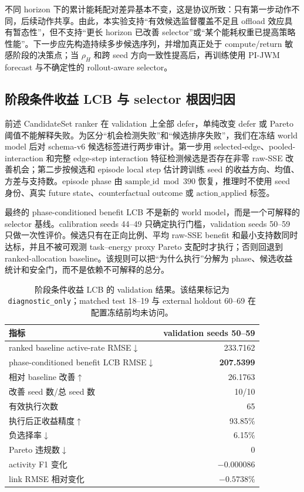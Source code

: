 \documentclass[letterpaper,journal]{IEEEtran}
\newcommand{\tabfontsize}{\footnotesize}
\begin{document}
不同 horizon 下的累计能耗配对差异基本不变，这是协议所致：只有第一步动作不同，后续动作共享。由此，本实验支持“有效候选监督覆盖不足且 offload 效应具有暂态性”，但不支持“更长 horizon 已改善 selector”或“某个能耗权重已提高策略性能”。下一步应先构造持续多步候选序列，并增加真正处于 compute/return 敏感阶段的决策点；当 $\rho_H$ 和跨 seed 方向一致性提高后，再训练使用 PI-JWM forecast 与不确定性的 rollout-aware selector。

\subsection{阶段条件收益 LCB 与 selector 根因归因}

前述 CandidateSet ranker 在 validation 上全部 defer，单纯改变 defer 或 Pareto 阈值不能解释失败。为区分“机会检测失败”和“候选排序失败”，我们在冻结 world model 后对 schema-v6 候选标签进行两步审计。第一步用 selected-edge、pooled-interaction 和完整 edge-step interaction 特征检测候选是否存在非零 raw-SSE 改善机会；第二步按候选和 episode local step 估计跨训练 seed 的收益方向、均值、方差与支持数。episode phase 由 $\text{sample\_id}\bmod390$ 恢复，推理时不使用 seed 身份、真实 future state、counterfactual outcome 或 $\text{action\_applied}$ 标签。

最终的 phase-conditioned benefit LCB 不是新的 world model，而是一个可解释的 selector 基线。calibration seeds 44--49 只确定执行门槛，validation seeds 50--59 只做一次性评价。候选只有在正向比例、平均 raw-SSE benefit 和最小支持数同时达标，并且不被可观测 task--energy proxy Pareto 支配时才执行；否则回退到 ranked-allocation baseline。该规则可以把“为什么执行”分解为 phase、候选收益统计和安全门，而不是依赖不可解释的总分。

\begin{table}[!t]
\centering
\tabfontsize
\begin{tabular}{lr}
\toprule
指标 & validation seeds 50--59 \\
\midrule
ranked baseline active-rate RMSE$\downarrow$ & 233.7162 \\
phase-conditioned benefit LCB RMSE$\downarrow$ & \textbf{207.5399} \\
相对 baseline 改善$\uparrow$ & 26.1763 \\
改善 seed 数/总 seed 数 & 10/10 \\
有效执行次数 & 65 \\
执行后正收益精度$\uparrow$ & 93.85\% \\
负选择率$\downarrow$ & 6.15\% \\
Pareto 违规数$\downarrow$ & 0 \\
activity F1 变化 & $-0.000086$ \\
link RMSE 相对变化 & $-0.5738\%$ \\
\bottomrule
\end{tabular}
\caption{阶段条件收益 LCB 的 validation 结果。该结果标记为 \texttt{diagnostic\_only}；matched test 18--19 与 external holdout 60--69 在配置冻结前均未访问。}
\label{tab:phase_benefit_lcb}
\end{table}
\end{document}

